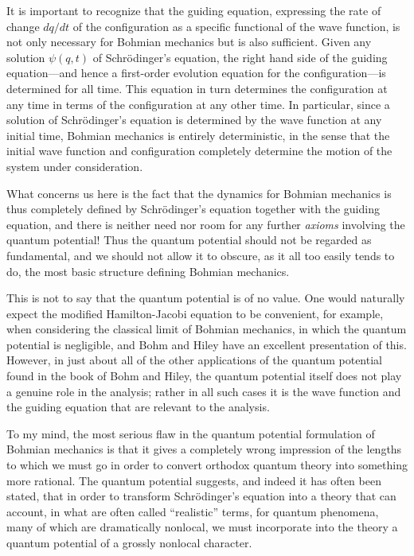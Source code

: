 \documentclass[12pt]{article}
\begin{document}
It is important to recognize that the guiding equation, expressing the rate
of change $dq/dt$ of the configuration as a specific functional of the wave
function, is not only necessary for Bohmian mechanics but is also
sufficient.  Given any solution $\psi(q,t)$ of Schr\"odinger's equation,
the right hand side of the guiding equation---and hence a first-order
evolution equation for the configuration---is determined for all time. This
equation in turn determines the configuration at any time in terms of the
configuration at any other time.  In particular, since a solution of
Schr\"odinger's equation is determined by the wave function at any initial
time, Bohmian mechanics is entirely deterministic, in the sense that the
initial wave function and configuration completely determine the motion of
the system under consideration.

What concerns us here is the fact that the dynamics for Bohmian mechanics
is thus completely defined by Schr\"odinger's equation together with the
guiding equation, and there is neither need nor room for any further {\it
axioms} involving the quantum potential! Thus the quantum potential
should not be regarded as fundamental, and we should not allow it to
obscure, as it all too easily tends to do, the most basic structure
defining Bohmian mechanics.

This is not to say that the quantum potential is of no value. One would
naturally expect the modified Hamilton-Jacobi equation to be convenient,
for example, when considering the classical limit of Bohmian mechanics, in
which the quantum potential is negligible, and Bohm and Hiley have an
excellent presentation of this.  However, in just about all of the other
applications of the quantum potential found in the book of Bohm and Hiley,
the quantum potential itself does not play a genuine role in the analysis;
rather in all such cases it is the wave function and the guiding equation
that are relevant to the analysis.

To my mind, the most serious flaw in the quantum potential formulation of
Bohmian mechanics is that it gives a completely wrong impression of the
lengths to which we must go in order to convert orthodox quantum theory
into something more rational. The quantum potential suggests, and indeed it
has often been stated, that in order to transform Schr\"odinger's equation
into a theory that can account, in what are often called ``realistic''
terms, for quantum phenomena, many of which are dramatically nonlocal, we
must incorporate into the theory a quantum potential of a grossly nonlocal
character.
\end{document}
